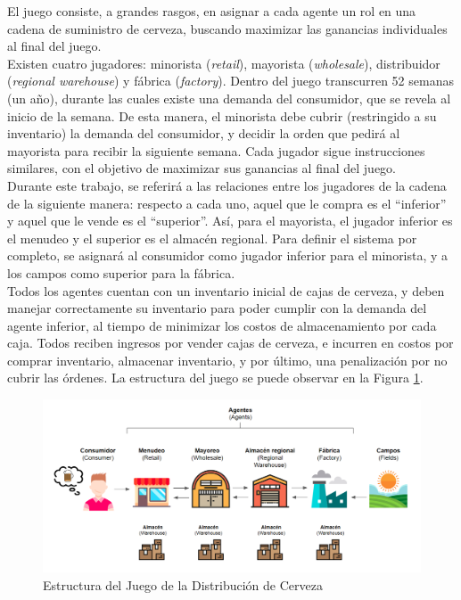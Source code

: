 El juego consiste, a grandes rasgos, en asignar a cada agente un rol en una cadena de suministro de cerveza, buscando maximizar las ganancias individuales al final del juego.\\

Existen cuatro jugadores: minorista (\textit{retail}), mayorista (\textit{wholesale}), distribuidor (\textit{regional warehouse}) y f\'abrica (\textit{factory}). Dentro del juego transcurren 52 semanas (un a\~no), durante las cuales existe una demanda del consumidor, que se revela al inicio de la semana. De esta manera, el minorista debe cubrir (restringido a su inventario) la demanda del consumidor, y decidir la orden que pedir\'a al mayorista para recibir la siguiente semana. Cada jugador sigue instrucciones similares, con el objetivo de maximizar sus ganancias al final del juego.\\

Durante este trabajo, se referir\'a a las relaciones entre los jugadores de la cadena de la siguiente manera: respecto a cada uno, aquel que le compra es el ``inferior'' y aquel que le vende es el ``superior''. As\'i, para el mayorista, el jugador inferior es el menudeo y el superior es el almac\'en regional. Para definir el sistema por completo, se asignar\'a al consumidor como jugador inferior para el minorista, y a los campos como superior para la f\'abrica.\\

Todos los agentes cuentan con un inventario inicial de cajas de cerveza, y deben manejar correctamente su inventario para poder cumplir con la demanda del agente inferior, al tiempo de minimizar los costos de almacenamiento por cada caja. Todos reciben ingresos por vender cajas de cerveza, e incurren en costos por comprar inventario, almacenar inventario, y por \'ultimo, una penalizaci\'on por no cubrir las \'ordenes. La estructura del juego se puede observar en la Figura \ref{structure}.\\


\begin{figure}[ht]
\label{structure}
\includegraphics[width=15cm]{tesis_tex/figs/beer_distribution_game_structure.PNG}
\caption[Estructura del Juego de la Distribución de Cerveza]{Estructura del Juego de la Distribución de Cerveza\protect\footnotemark}
\centering
\end{figure}

